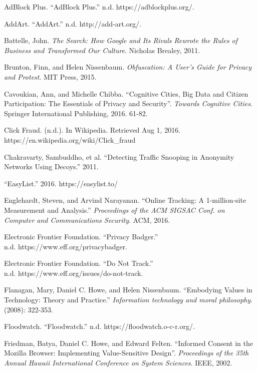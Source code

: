 \documentclass[conference]{IEEEtran}
\begin{document}
\begin{thebibliography}{99}

 AdBlock Plus. “AdBlock Plus.” n.d. https://adblockplus.org/.

 AddArt. “AddArt.” n.d. http://add-art.org/.

 Battelle, John. \textit{ The Search: How Google and Its Rivals Rewrote the Rules of Business and Transformed Our Culture}. Nicholas Brealey, 2011.

 Brunton, Finn, and Helen Nissenbaum. \textit{Obfuscation: A User's Guide for Privacy and Protest}. MIT Press, 2015.

 Cavoukian, Ann, and Michelle Chibba. “Cognitive Cities, Big Data and Citizen Participation: The Essentials of Privacy and Security”. \textit{Towards Cognitive Cities}. Springer International Publishing, 2016. 61-82.

 Click Fraud. (n.d.). In Wikipedia. Retrieved Aug 1, 2016. https://en.wikipedia.org/wiki/Click\_fraud

 Chakravarty, Sambuddho, et al. “Detecting Traffic Snooping in Anonymity Networks Using Decoys.” 2011.

 “EasyList.” 2016. https://easylist.to/

 Englehardt, Steven, and Arvind Narayanan. “Online Tracking: A 1-million-site Measurement and Analysis.” \textit{Proceedings of the ACM SIGSAC Conf. on Computer and Communications Security}. ACM, 2016.

 Electronic Frontier Foundation. “Privacy Badger.”\\n.d. https://www.eff.org/privacybadger.

 Electronic Frontier Foundation. “Do Not Track.”\\n.d. https://www.eff.org/issues/do-not-track.

 Flanagan, Mary, Daniel C. Howe, and Helen Nissenbaum. “Embodying Values in Technology: Theory and Practice.” \textit{Information technology and moral philosophy}. (2008): 322-353.

 Floodwatch. “Floodwatch.” n.d. https://floodwatch.o-c-r.org/.

 Friedman, Batya, Daniel C. Howe, and Edward Felten. “Informed Consent in the Mozilla Browser: Implementing Value-Sensitive Design”. \textit{Proceedings of the 35th Annual Hawaii International Conference on System Sciences}. IEEE, 2002.


\end{thebibliography}
\end{document}
